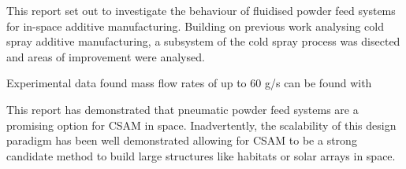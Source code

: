 This report set out to investigate the behaviour of fluidised powder feed systems for in-space additive manufacturing. Building on previous work analysing cold spray additive manufacturing, a subsystem of the cold spray process was disected and areas of improvement were analysed.

Experimental data found mass flow rates of up to 60 g/s can be found with


This report has demonstrated that pneumatic powder feed systems are a promising option for CSAM in space. Inadvertently, the scalability of this design paradigm has been well demonstrated allowing for CSAM to be a strong candidate method to build large structures like habitats or solar arrays in space.